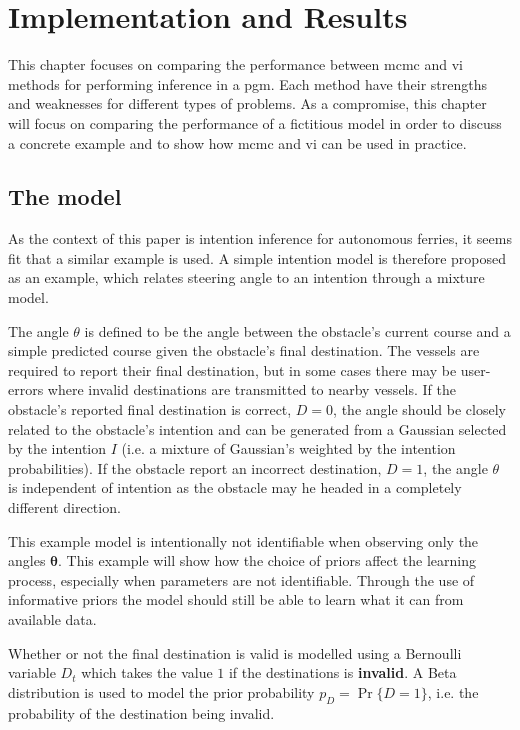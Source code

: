 \chapter{Implementation and Results}\label{chap:impl}

This chapter focuses on comparing the performance between \acrshort{mcmc} and \acrshort{vi} methods for performing inference in a \acrshort{pgm}. Each method have their strengths and weaknesses for different types of problems. As a compromise, this chapter will focus on comparing the performance of a fictitious model in order to discuss a concrete example and to show how \acrshort{mcmc} and \acrshort{vi} can be used in practice.  

\section{The model}
As the context of this paper is intention inference for autonomous ferries, it seems fit that a similar example is used. A simple intention model is therefore proposed as an example, which relates steering angle to an intention through a mixture model. 

The angle $\theta$ is defined to be the angle between the obstacle's current course and a simple predicted course given the obstacle's final destination. The vessels are required to report their final destination, but in some cases there may be user-errors where invalid destinations are transmitted to nearby vessels. If the obstacle's reported final destination is correct, $D=0$, the angle should be closely related to the obstacle's intention and can be generated from a Gaussian selected by the intention $I$ (i.e. a mixture of Gaussian's weighted by the intention probabilities). If the obstacle report an incorrect destination, $D=1$, the angle $\theta$ is independent of intention as the obstacle may he headed in a completely different direction.

This example model is intentionally not identifiable when observing only the angles $\boldsymbol{\theta}$. This example will show how the choice of priors affect the learning process, especially when parameters are not identifiable. Through the use of informative priors the model should still be able to learn what it can from available data.   

Whether or not the final destination is valid is modelled using a Bernoulli variable $D_t$ which takes the value $1$ if the destinations is \textbf{invalid}. A Beta distribution is used to model the prior probability $p_D = \Pr \{D=1\}$, i.e. the probability of the destination being invalid.  

